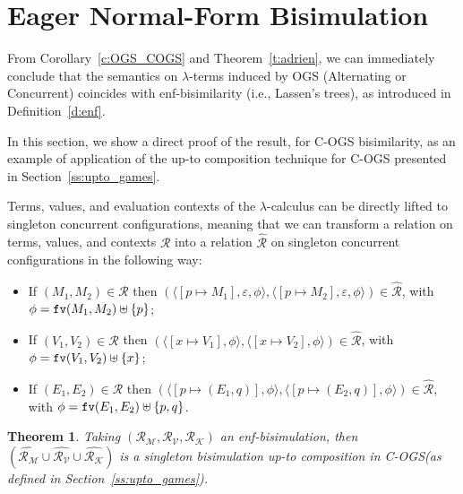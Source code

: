 \documentclass[11pt,a4paper]{amsart}
\theoremstyle{plain}
\theoremstyle{definition}
\theoremstyle{defC}
\theoremstyle{thmC}
\theoremstyle{plain}
\numberwithin{equation}{section}
\newcommand{\COGS}{\mbox{{\rm C-OGS}}\xspace}      %
\def\fv#1{\mbox{\tt fv}(#1)}         %
\def\R{{\mathcal R}}
\def\RR{\mathrel{\mathcal R}}
\newcommand{\enfM}{\mathcal{M}}
\newcommand{\enfK}{\mathcal{K}}
\newcommand{\enfV}{\mathcal{V}}
\newcommand{\emptymap}{\varepsilon}
\newcommand{\pmap}[2]{[#1 \mapsto #2]}
\newcommand{\conf}[1]{\langle #1\rangle}
\newcommand{\liftRel}[1]{\widehat{#1}}
\theoremstyle{plain}
\newtheorem{theorem}[thm]{Theorem}
\theoremstyle{definition}
\begin{document}
\section{Eager Normal-Form Bisimulation}
\label{s:enf}


From Corollary~\ref{c:OGS_COGS} and Theorem~\ref{t:adrien},
we can immediately conclude that the semantics on $\lambda$-terms induced by OGS
(Alternating or Concurrent) coincides with 
enf-bisimilarity (i.e., Lassen's trees), as introduced in Definition~\ref{d:enf}. 

In this section, we show a direct proof of the result, for \COGS bisimilarity, 
as an example of application of the  
up-to composition technique for \COGS
 presented in Section~\ref{ss:upto_games}.



Terms, values, and evaluation contexts  of the $\lambda$-calculus can be directly lifted to singleton concurrent configurations,
meaning that we can transform a relation on terms, values, and contexts $\R$ into
a relation $\liftRel{\R}$ on singleton concurrent configurations in the following way:
\begin{itemize}
 \item If $(M_1,M_2) \in \R$ then $(\conf{\pmap{p}{M_1},\emptymap,\phi},
 \conf{\pmap{p}{M_2},\emptymap,\phi}) \in \liftRel{\R}$, 
 with $\phi = \fv{M_1,M_2} \uplus \{p\}$;
%
 \item If $(V_1,V_2) \in \R$ then $(\conf{\pmap{x}{V_1},\phi},\conf{\pmap{x}{V_2},\phi})
 \in \liftRel{\R}$, with $\phi= \fv{V_1,V_2} \uplus \{x\}$;
%
 \item If $(E_1,E_2) \in \R$ then $(\conf{\pmap{p}{(E_1,q)},\phi},
  \conf{\pmap{p}{(E_2,q)},\phi}) \in \liftRel{\R}$, with 
  $\phi= \fv{E_1,E_2} \uplus \{p,q\}$.
\end{itemize}

\begin{theorem}
 Taking $(\RR_{\enfM},\RR_{\enfV},\RR_{\enfK})$ an enf-bisimulation, then 
 $(\liftRel{\RR_{\enfM}} \cup \liftRel{\RR_{\enfV}} \cup \liftRel{\RR_{\enfK}})$
 is a singleton bisimulation up-to composition in \COGS (as defined in Section~\ref{ss:upto_games}).
\end{theorem}
\end{document}
